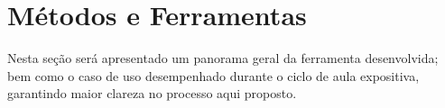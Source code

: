 \section{Métodos e Ferramentas}\label{sec:metodologia}
Nesta seção será apresentado um panorama geral da ferramenta desenvolvida; bem como o caso de uso desempenhado durante o ciclo de aula expositiva, garantindo maior clareza no processo aqui proposto.







